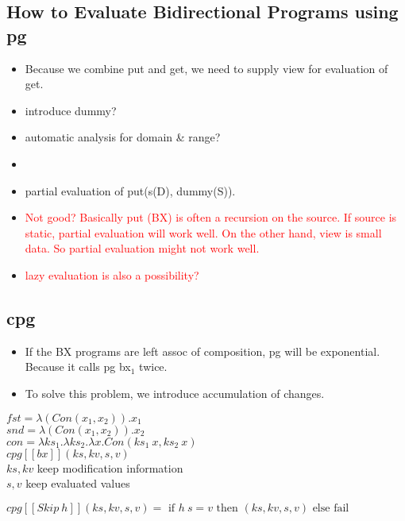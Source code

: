 \documentclass[runningheads]{llncs}
\newcommand{\tab}{\hspace*{5mm}}
\newcommand{\cpg}[5]{cpg [\![#1]\!] (#2, #3, #4, #5)}
\begin{document}
\subsection{How to Evaluate Bidirectional Programs using pg}

\begin{itemize}
\item Because we combine put and get, we need to supply view for evaluation of get.
\item introduce dummy?
\item automatic analysis for domain \& range?
\item 
\item partial evaluation of put(s(D), dummy(S)).
\item \textcolor{red}{Not good? Basically put (BX) is often a recursion on the source. If source is static, partial evaluation will work well. On the other hand, view is small data. So partial evaluation might not work well.}
\item \textcolor{red}{lazy evaluation is also a possibility?}
\end{itemize}

\subsection{cpg}

\begin{itemize}
\item If the BX programs are left assoc of composition, pg will be exponential. Because it calls pg bx$_1$ twice.
\item To solve this problem, we introduce accumulation of changes.
\end{itemize}

$fst = \lambda (Con (x_1, x_2)). x_1$\\
$snd = \lambda (Con (x_1, x_2)). x_2$\\
$con = \lambda ks_1. \lambda ks_2. \lambda x. Con(ks_1 \ x, ks_2 \ x)$\\

$\cpg{bx}{ks}{kv}{s}{v}$ \\
    \tab $ks, kv$ keep modification information\\
    \tab $s, v$ keep evaluated values\\
\vspace{3mm}

$\cpg{Skip \ h}{ks}{kv}{s}{v} = \text{ if } h \ s = v \text{ then } (ks, kv, s, v) \text{ else fail}$\\
\end{document}

